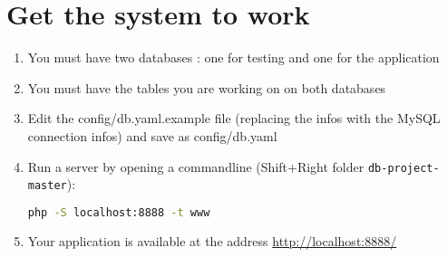 \documentclass[twoside,a4paper,12pt]{article}
\begin{document}
\section{Get the system to work}
\label{sec:work}
\begin{enumerate}
\item You must have two databases : one for testing and one for the application
\item You must have the tables you are working on on both databases
\item Edit the config/db.yaml.example file (replacing the infos with the MySQL connection infos) and save as config/db.yaml
\item Run a server by opening a commandline (Shift+Right  folder \texttt{db-project-master}):
\begin{lstlisting}[language=bash]
php -S localhost:8888 -t www
\end{lstlisting}
\item Your application is available at the address \url{http://localhost:8888/}
\end{enumerate}
\end{document}
